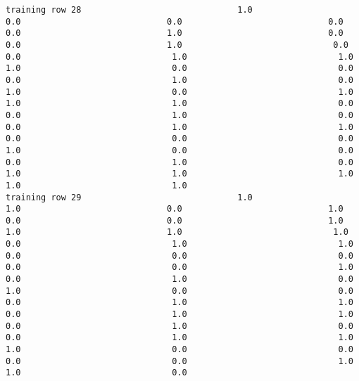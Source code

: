 \documentclass[11pt]{article}
\begin{document}
\begin{verbatim}
training row 28                               1.0                             0.0                             0.0                             0.0                             0.0                             1.0                             0.0                             0.0                             1.0                              0.0                              0.0                              1.0                              1.0                              1.0                              0.0                              0.0                              0.0                              1.0                              0.0                              1.0                              0.0                              1.0                              1.0                              1.0                              0.0                              0.0                              1.0                              0.0                              0.0                              1.0                              1.0                              0.0                              0.0                              0.0                              1.0                              0.0                              0.0                              0.0                              1.0                              0.0                              1.0                              1.0                              1.0                              1.0                              1.0
training row 29                               1.0                             1.0                             0.0                             1.0                             0.0                             0.0                             1.0                             1.0                             1.0                              1.0                              0.0                              1.0                              1.0                              0.0                              0.0                              0.0                              0.0                              0.0                              1.0                              0.0                              1.0                              0.0                              1.0                              0.0                              0.0                              0.0                              1.0                              1.0                              0.0                              1.0                              1.0                              0.0                              1.0                              0.0                              0.0                              1.0                              1.0                              1.0                              0.0                              0.0                              0.0                              0.0                              1.0                              1.0                              0.0

\end{verbatim}
\end{document}

